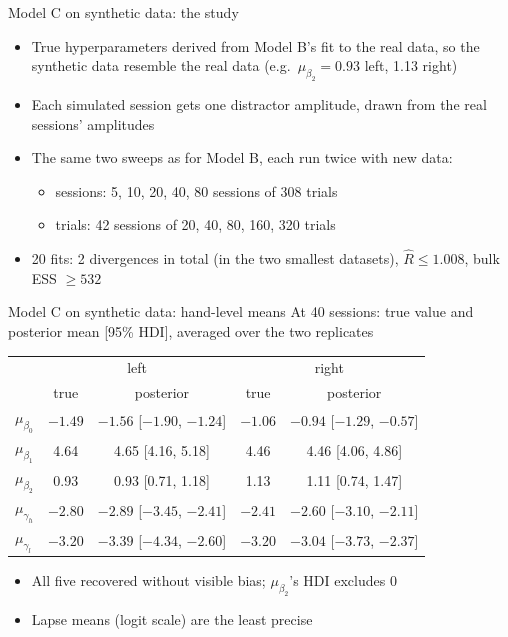 \begin{frame}{Model C on synthetic data: the study}
  \begin{itemize}
    \item True hyperparameters derived from Model B's fit to the real data, so the synthetic
          data resemble the real data (e.g.\ $\mu_{\beta_2} = 0.93$ left, 1.13 right)
    \item Each simulated session gets one distractor amplitude, drawn from the real sessions' amplitudes
    \item The same two sweeps as for Model B, each run twice with new data:
    \begin{itemize}
      \item sessions: 5, 10, 20, 40, 80 sessions of 308 trials
      \item trials: 42 sessions of 20, 40, 80, 160, 320 trials
    \end{itemize}
    \item 20 fits: 2 divergences in total (in the two smallest datasets),
          $\hat{R} \le 1.008$, bulk ESS $\ge 532$
  \end{itemize}
\end{frame}

\begin{frame}{Model C on synthetic data: hand-level means}
  At 40 sessions: true value and posterior mean [95\% HDI], averaged over the two replicates
  \vspace{0.5em}

  \centering\small
  \begin{tabular}{lcccc}
    \toprule
     & \multicolumn{2}{c}{left} & \multicolumn{2}{c}{right} \\
     & true & posterior & true & posterior \\
    \midrule
    $\mu_{\beta_0}$  & $-1.49$ & $-1.56$ [$-1.90$, $-1.24$] & $-1.06$ & $-0.94$ [$-1.29$, $-0.57$] \\
    $\mu_{\beta_1}$  & 4.64    & 4.65 [4.16, 5.18]          & 4.46    & 4.46 [4.06, 4.86] \\
    $\mu_{\beta_2}$  & 0.93    & 0.93 [0.71, 1.18]          & 1.13    & 1.11 [0.74, 1.47] \\
    $\mu_{\gamma_h}$ & $-2.80$ & $-2.89$ [$-3.45$, $-2.41$] & $-2.41$ & $-2.60$ [$-3.10$, $-2.11$] \\
    $\mu_{\gamma_l}$ & $-3.20$ & $-3.39$ [$-4.34$, $-2.60$] & $-3.20$ & $-3.04$ [$-3.73$, $-2.37$] \\
    \bottomrule
  \end{tabular}

  \vspace{0.5em}
  \raggedright
  \begin{itemize}
    \item All five recovered without visible bias; $\mu_{\beta_2}$'s HDI excludes 0
    \item Lapse means (logit scale) are the least precise
  \end{itemize}
\end{frame}


